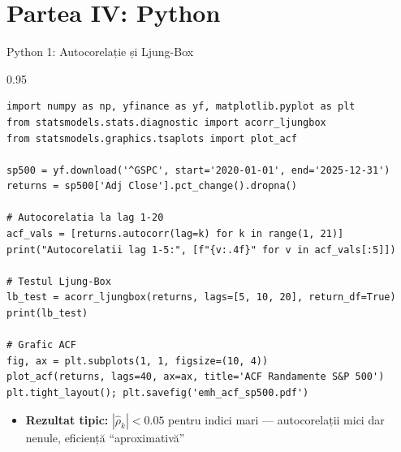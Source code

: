 \documentclass[9pt, aspectratio=169, t]{beamer}
\begin{document}
\section{Partea IV: Python}

\begin{frame}[fragile]{Python 1: Autocorelație și Ljung-Box}
    \begin{cminipage}{0.95\textwidth}
\vspace{-2mm}
\begin{lstlisting}[basicstyle=\ttfamily\scriptsize]
import numpy as np, yfinance as yf, matplotlib.pyplot as plt
from statsmodels.stats.diagnostic import acorr_ljungbox
from statsmodels.graphics.tsaplots import plot_acf

sp500 = yf.download('^GSPC', start='2020-01-01', end='2025-12-31')
returns = sp500['Adj Close'].pct_change().dropna()

# Autocorelatia la lag 1-20
acf_vals = [returns.autocorr(lag=k) for k in range(1, 21)]
print("Autocorelatii lag 1-5:", [f"{v:.4f}" for v in acf_vals[:5]])

# Testul Ljung-Box
lb_test = acorr_ljungbox(returns, lags=[5, 10, 20], return_df=True)
print(lb_test)

# Grafic ACF
fig, ax = plt.subplots(1, 1, figsize=(10, 4))
plot_acf(returns, lags=40, ax=ax, title='ACF Randamente S&P 500')
plt.tight_layout(); plt.savefig('emh_acf_sp500.pdf')
\end{lstlisting}
\vspace{-2mm}
\begin{itemize}\setlength{\itemsep}{0pt}
    \item \textbf{Rezultat tipic:} $|\hat\rho_k| < 0.05$ pentru indici mari --- autocorelații mici dar nenule, eficiență ``aproximativă''
\end{itemize}
\vspace{-1mm}
    \end{cminipage}
\end{frame}
\end{document}
